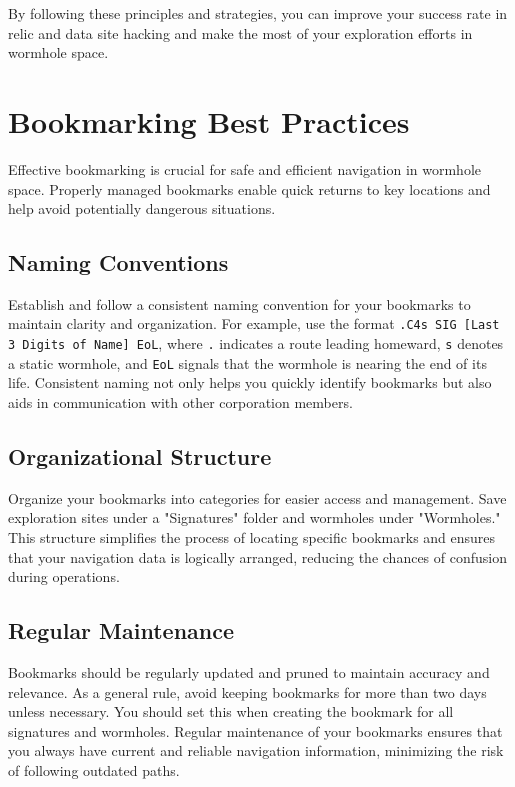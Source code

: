 \documentclass[a4paper,12pt]{article}
\begin{document}
By following these principles and strategies, you can improve your success rate in relic and data site hacking and make the most of your exploration efforts in wormhole space.

\section{Bookmarking Best Practices}

Effective bookmarking is crucial for safe and efficient navigation in wormhole space. Properly managed bookmarks enable quick returns to key locations and help avoid potentially dangerous situations.

\subsection{Naming Conventions}

Establish and follow a consistent naming convention for your bookmarks to maintain clarity and organization. For example, use the format \texttt{.C4s SIG [Last 3 Digits of Name] EoL}, where \texttt{.} indicates a route leading homeward, \texttt{s} denotes a static wormhole, and \texttt{EoL} signals that the wormhole is nearing the end of its life. Consistent naming not only helps you quickly identify bookmarks but also aids in communication with other corporation members.

\subsection{Organizational Structure}

Organize your bookmarks into categories for easier access and management. Save exploration sites under a "Signatures" folder and wormholes under "Wormholes." This structure simplifies the process of locating specific bookmarks and ensures that your navigation data is logically arranged, reducing the chances of confusion during operations.

\subsection{Regular Maintenance}

Bookmarks should be regularly updated and pruned to maintain accuracy and relevance. As a general rule, avoid keeping bookmarks for more than two days unless necessary. You should set this when creating the bookmark for all signatures and wormholes. Regular maintenance of your bookmarks ensures that you always have current and reliable navigation information, minimizing the risk of following outdated paths.
\end{document}
